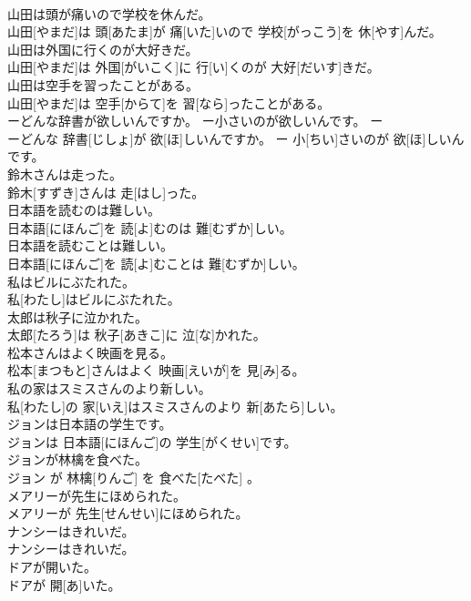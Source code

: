 \documentclass[8pt]{extreport}
\begin{document}
\begin{CJK}{UTF8}{min}
\\	山田は頭が痛いので学校を休んだ。	
\\	山田[やまだ]は 頭[あたま]が 痛[いた]いので 学校[がっこう]を 休[やす]んだ。
\\	山田は外国に行くのが大好きだ。	
\\	山田[やまだ]は 外国[がいこく]に 行[い]くのが 大好[だいす]きだ。
\\	山田は空手を習ったことがある。	
\\	山田[やまだ]は 空手[からて]を 習[なら]ったことがある。
\\	ーどんな辞書が欲しいんですか。 ー小さいのが欲しいんです。	ー
\\	ーどんな 辞書[じしょ]が 欲[ほ]しいんですか。 ー 小[ちい]さいのが 欲[ほ]しいんです。
\\	鈴木さんは走った。	
\\	鈴木[すずき]さんは 走[はし]った。
\\	日本語を読むのは難しい。	
\\	日本語[にほんご]を 読[よ]むのは 難[むずか]しい。
\\	日本語を読むことは難しい。	
\\	日本語[にほんご]を 読[よ]むことは 難[むずか]しい。
\\	私はビルにぶたれた。	
\\	私[わたし]はビルにぶたれた。
\\	太郎は秋子に泣かれた。	
\\	太郎[たろう]は 秋子[あきこ]に 泣[な]かれた。
\\	松本さんはよく映画を見る。	
\\	松本[まつもと]さんはよく 映画[えいが]を 見[み]る。
\\	私の家はスミスさんのより新しい。	
\\	私[わたし]の 家[いえ]はスミスさんのより 新[あたら]しい。
\\	ジョンは日本語の学生です。	
\\	ジョンは 日本語[にほんご]の 学生[がくせい]です。
\\	ジョンが林檎を食べた。	
\\	ジョン が 林檎[りんご] を 食べた[たべた] 。
\\	メアリーが先生にほめられた。	
\\	メアリーが 先生[せんせい]にほめられた。
\\	ナンシーはきれいだ。	
\\	ナンシーはきれいだ。
\\	ドアが開いた。	
\\	ドアが 開[あ]いた。

\end{CJK}
\end{document}
